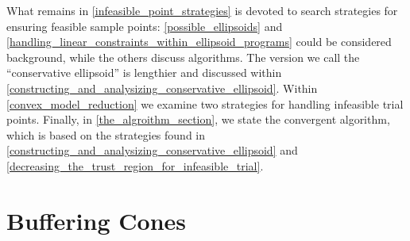 What remains in \cref{infeasible_point_strategies} is devoted to search strategies for ensuring feasible sample points:
\cref{possible_ellipsoids} and \cref{handling_linear_constraints_within_ellipsoid_programs} could be considered background, while the others discuss algorithms.
The version we call the ``conservative ellipsoid'' is lengthier and discussed within \cref{constructing_and_analysizing_conservative_ellipsoid}.
Within \cref{convex_model_reduction} we examine two strategies for handling infeasible trial points.
Finally, in \cref{the_algroithm_section}, we state the convergent algorithm, which is based on the strategies found in 
\cref{constructing_and_analysizing_conservative_ellipsoid} and \cref{decreasing_the_trust_region_for_infeasible_trial}.






% 
% 
% 
% 
% 
% 



\section{Buffering Cones}
\label{buffering_cones}


